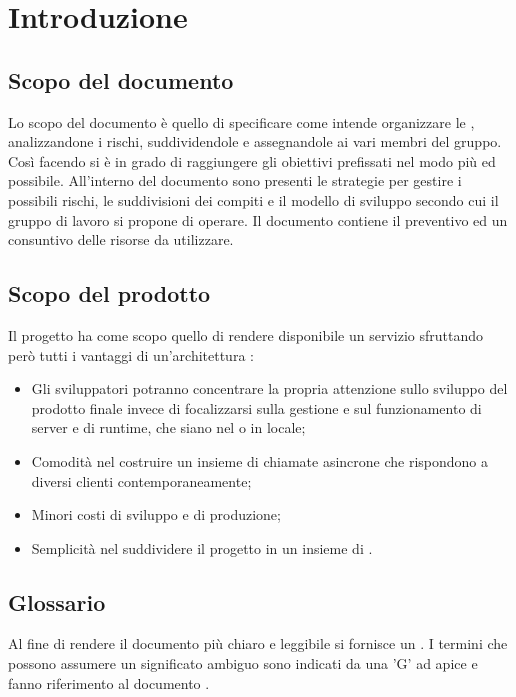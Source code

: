\section{Introduzione}
\label{introduzione}
\subsection{Scopo del documento}
Lo scopo del documento è quello di specificare come {\Gruppo} intende organizzare le , analizzandone i rischi, suddividendole e assegnandole ai vari membri del gruppo. Così facendo si è in grado di raggiungere gli obiettivi prefissati nel modo più  ed  possibile. All'interno del documento sono presenti le strategie per gestire i possibili rischi, le suddivisioni dei compiti e il modello di sviluppo secondo cui il gruppo di lavoro si propone di operare. Il documento contiene il preventivo ed un consuntivo delle risorse da utilizzare.

\subsection{Scopo del prodotto}
Il progetto {\NomeProgetto} ha come scopo quello di rendere disponibile un servizio  sfruttando però tutti i vantaggi di un'architettura :
\begin{itemize}
    \item Gli sviluppatori potranno concentrare la propria attenzione sullo sviluppo del prodotto finale invece di focalizzarsi sulla gestione e sul funzionamento di server e di runtime, che siano nel  o in locale;
    \item Comodità nel costruire un insieme di chiamate asincrone che rispondono a diversi clienti contemporaneamente;
    \item Minori costi di sviluppo e di produzione;
    \item Semplicità nel suddividere il progetto in un insieme di .
\end{itemize}

\subsection{Glossario}
Al fine di rendere il documento più chiaro e leggibile si fornisce un \Glossario{}. I termini che possono assumere un significato ambiguo sono indicati da una 'G' ad apice e fanno riferimento al documento .

